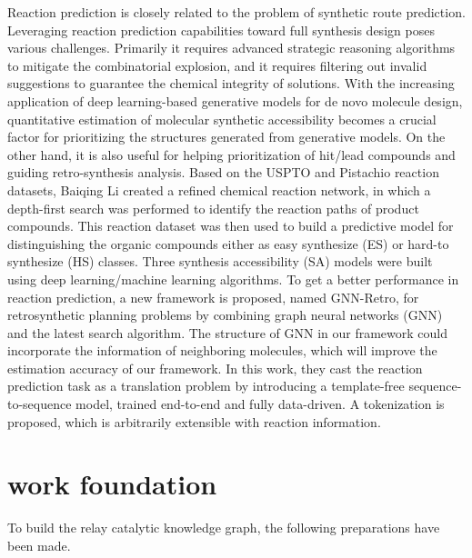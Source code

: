 \documentclass[%
 aip,
 jmp,%
 amsmath,amssymb,
 reprint,%
]{revtex4-2}
\begin{document}
Reaction prediction is closely related to the problem of synthetic route prediction. 
Leveraging reaction prediction capabilities toward full synthesis design poses various challenges. 
Primarily it requires advanced strategic reasoning algorithms to mitigate the combinatorial explosion, 
and it requires filtering out invalid suggestions to guarantee the chemical integrity of solutions.
With the increasing application of deep learning-based generative models for de novo
molecule design, quantitative estimation of molecular synthetic accessibility becomes
a crucial factor for prioritizing the structures generated from generative models. On the 
other hand, it is also useful for helping prioritization of hit/lead compounds and guiding 
retro-synthesis analysis. Based on the USPTO and Pistachio reaction datasets,
Baiqing Li created a refined chemical reaction network, in which a depth-first search 
was performed to identify the reaction paths of product compounds. This 
reaction dataset was then used to build a predictive model for distinguishing the organic 
compounds either as easy synthesize (ES) or hard-to synthesize (HS) classes. Three 
synthesis accessibility (SA) models were built using deep learning/machine learning 
algorithms.
To get a better performance in reaction prediction, a new framework is proposed, named GNN-Retro, for
retrosynthetic planning problems by combining graph neural
networks (GNN) and the latest search algorithm. 
The structure of GNN in our framework could incorporate the information of neighboring molecules, 
which will improve the estimation accuracy of our framework.
In this work, they cast the reaction
prediction task as a translation problem by introducing a template-free sequence-to-sequence model,
trained end-to-end and fully data-driven. A tokenization is proposed, which is arbitrarily extensible with
reaction information.


\section{work foundation}
To build the relay catalytic knowledge graph, the following preparations have been made.
\end{document}
